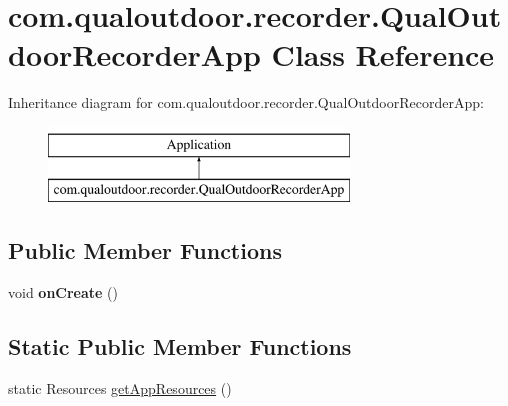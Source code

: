 \hypertarget{classcom_1_1qualoutdoor_1_1recorder_1_1QualOutdoorRecorderApp}{\section{com.\-qualoutdoor.\-recorder.\-Qual\-Outdoor\-Recorder\-App Class Reference}
\label{classcom_1_1qualoutdoor_1_1recorder_1_1QualOutdoorRecorderApp}
}
Inheritance diagram for com.\-qualoutdoor.\-recorder.\-Qual\-Outdoor\-Recorder\-App\-:\begin{figure}[H]
\begin{center}
\leavevmode
\includegraphics[height=2.000000cm]{classcom_1_1qualoutdoor_1_1recorder_1_1QualOutdoorRecorderApp}
\end{center}
\end{figure}
\subsection*{Public Member Functions}
\begin{DoxyCompactItemize}
\item 
\hypertarget{classcom_1_1qualoutdoor_1_1recorder_1_1QualOutdoorRecorderApp_a66eba257bf8a5aae2c954a1237230324}{void {\bfseries on\-Create} ()}\label{classcom_1_1qualoutdoor_1_1recorder_1_1QualOutdoorRecorderApp_a66eba257bf8a5aae2c954a1237230324}

\end{DoxyCompactItemize}
\subsection*{Static Public Member Functions}
\begin{DoxyCompactItemize}
\item 
static Resources \hyperlink{classcom_1_1qualoutdoor_1_1recorder_1_1QualOutdoorRecorderApp_a2359bedba32c2d5917d3a083041bf441}{get\-App\-Resources} ()
\end{DoxyCompactItemize}
